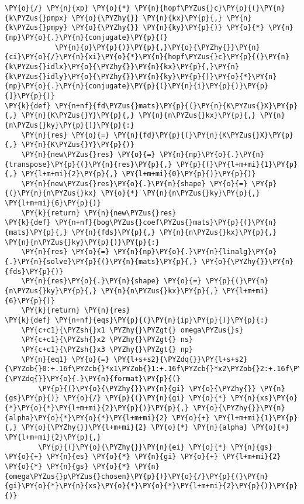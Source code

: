 \begin{Verbatim}[commandchars=\\\{\}]
         \PY{o}{/} \PY{n}{xp} \PY{o}{*} \PY{n}{hopf\PYZus{}c}\PY{p}{(}\PY{n}{k\PYZus{}pmpx} \PY{o}{\PYZhy{}} \PY{n}{kx}\PY{p}{,} \PY{n}{k\PYZus{}pmpy} \PY{o}{\PYZhy{}} \PY{n}{ky}\PY{p}{)} \PY{o}{*} \PY{n}{np}\PY{o}{.}\PY{n}{conjugate}\PY{p}{(}
            \PY{n}{p}\PY{p}{)}\PY{p}{,}\PY{o}{\PYZhy{}}\PY{n}{ci}\PY{o}{/}\PY{n}{xi}\PY{o}{*}\PY{n}{hopf\PYZus{}c}\PY{p}{(}\PY{n}{k\PYZus{}idlx}\PY{o}{\PYZhy{}}\PY{n}{kx}\PY{p}{,}\PY{n}{k\PYZus{}idly}\PY{o}{\PYZhy{}}\PY{n}{ky}\PY{p}{)}\PY{o}{*}\PY{n}{np}\PY{o}{.}\PY{n}{conjugate}\PY{p}{(}\PY{n}{i}\PY{p}{)}\PY{p}{]}\PY{p}{)}
\PY{k}{def} \PY{n+nf}{fd\PYZus{}mats}\PY{p}{(}\PY{n}{K\PYZus{}X}\PY{p}{,} \PY{n}{K\PYZus{}Y}\PY{p}{,} \PY{n}{n\PYZus{}kx}\PY{p}{,} \PY{n}{n\PYZus{}ky}\PY{p}{)}\PY{p}{:}
    \PY{n}{res} \PY{o}{=} \PY{n}{fd}\PY{p}{(}\PY{n}{K\PYZus{}X}\PY{p}{,} \PY{n}{K\PYZus{}Y}\PY{p}{)}
    \PY{n}{new\PYZus{}res} \PY{o}{=} \PY{n}{np}\PY{o}{.}\PY{n}{transpose}\PY{p}{(}\PY{n}{res}\PY{p}{,} \PY{p}{(}\PY{l+m+mi}{1}\PY{p}{,} \PY{l+m+mi}{2}\PY{p}{,} \PY{l+m+mi}{0}\PY{p}{)}\PY{p}{)}
    \PY{n}{new\PYZus{}res}\PY{o}{.}\PY{n}{shape} \PY{o}{=} \PY{p}{(}\PY{n}{n\PYZus{}kx} \PY{o}{*} \PY{n}{n\PYZus{}ky}\PY{p}{,} \PY{l+m+mi}{6}\PY{p}{)}
    \PY{k}{return} \PY{n}{new\PYZus{}res}
\PY{k}{def} \PY{n+nf}{bog\PYZus{}coef\PYZus{}mats}\PY{p}{(}\PY{n}{mats}\PY{p}{,} \PY{n}{fds}\PY{p}{,} \PY{n}{n\PYZus{}kx}\PY{p}{,} \PY{n}{n\PYZus{}ky}\PY{p}{)}\PY{p}{:}
    \PY{n}{res} \PY{o}{=} \PY{n}{np}\PY{o}{.}\PY{n}{linalg}\PY{o}{.}\PY{n}{solve}\PY{p}{(}\PY{n}{mats}\PY{p}{,} \PY{o}{\PYZhy{}}\PY{n}{fds}\PY{p}{)}
    \PY{n}{res}\PY{o}{.}\PY{n}{shape} \PY{o}{=} \PY{p}{(}\PY{n}{n\PYZus{}ky}\PY{p}{,} \PY{n}{n\PYZus{}kx}\PY{p}{,} \PY{l+m+mi}{6}\PY{p}{)}
    \PY{k}{return} \PY{n}{res}
\PY{k}{def} \PY{n+nf}{eqs}\PY{p}{(}\PY{n}{ip}\PY{p}{)}\PY{p}{:}
    \PY{c+c1}{\PYZsh{}x1 \PYZhy{}\PYZgt{} omega\PYZus{}s}
    \PY{c+c1}{\PYZsh{}x2 \PYZhy{}\PYZgt{} ns}
    \PY{c+c1}{\PYZsh{}x3 \PYZhy{}\PYZgt{} np}
    \PY{n}{eq1} \PY{o}{=} \PY{l+s+s2}{\PYZdq{}}\PY{l+s+s2}{\PYZob{}0:+.16f\PYZcb{}*x1\PYZob{}1:+.16f\PYZcb{}*x2\PYZob{}2:+.16f\PYZcb{}*x3\PYZob{}3:+.16f\PYZcb{};}\PY{l+s+s2}{\PYZdq{}}\PY{o}{.}\PY{n}{format}\PY{p}{(}
        \PY{p}{(}\PY{o}{\PYZhy{}}\PY{n}{gi} \PY{o}{\PYZhy{}} \PY{n}{gs}\PY{p}{)} \PY{o}{/} \PY{p}{(}\PY{n}{gi} \PY{o}{*} \PY{n}{xs}\PY{o}{*}\PY{o}{*}\PY{l+m+mi}{2}\PY{p}{)}\PY{p}{,} \PY{o}{\PYZhy{}}\PY{n}{alpha}\PY{o}{*}\PY{o}{*}\PY{l+m+mi}{2} \PY{o}{+} \PY{l+m+mi}{1}\PY{p}{,} \PY{o}{\PYZhy{}}\PY{l+m+mi}{2} \PY{o}{*} \PY{n}{alpha} \PY{o}{+} \PY{l+m+mi}{2}\PY{p}{,}
        \PY{p}{(}\PY{o}{\PYZhy{}}\PY{n}{ei} \PY{o}{*} \PY{n}{gs} \PY{o}{+} \PY{n}{es} \PY{o}{*} \PY{n}{gi} \PY{o}{+} \PY{l+m+mi}{2} \PY{o}{*} \PY{n}{gs} \PY{o}{*} \PY{n}{omega\PYZus{}p\PYZus{}chosen}\PY{p}{)}\PY{o}{/}\PY{p}{(}\PY{n}{gi}\PY{o}{*}\PY{n}{xs}\PY{o}{*}\PY{o}{*}\PY{l+m+mi}{2}\PY{p}{)}\PY{p}{)}

\end{Verbatim}
